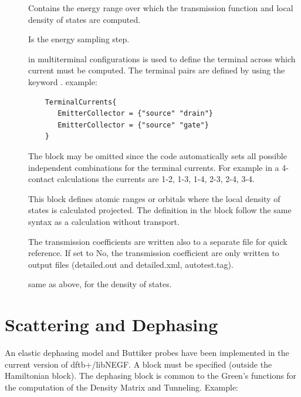 \begin{description}


\item[] Contains the energy range over
  which the transmission function and local density of states are computed.
\item[] Is the energy sampling step.
\item[] in multiterminal configurations is used to define
  the terminal across which current must be computed. The terminal pairs are
  defined by using the keyword . example:
  
   \begin{verbatim}
    TerminalCurrents{
       EmitterCollector = {"source" "drain"}
       EmitterCollector = {"source" "gate"}
    }
  \end{verbatim}   
  
  The block  may be omitted since the code automatically
  sets all possible independent combinations for the terminal currents. For
  example in a 4-contact calculations the currents are 1-2, 1-3, 1-4, 2-3, 2-4,
  3-4.
\item[] \label{Region} This block defines atomic ranges or orbitals
  where the local density of states is calculated projected. The definition in
  the block follow the same syntax as a \dftbp{} calculation without transport.
\item[] The transmission coefficients are written also to a
  separate file for quick reference. If set to No, the transmission coefficient
  are only written to \dftbp{} output files (detailed.out and detailed.xml,
  autotest.tag).
\item[] same as above, for the density of states.

\end{description}

\section{Scattering and Dephasing}

An elastic dephasing model and Buttiker probes have been implemented in the current 
version of dftb+/libNEGF.
A  block must be specified (outside the Hamiltonian block). 
The dephasing block is common to the Green's functions for the computation 
of the Density Matrix and Tunneling.
Example:

